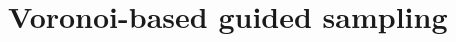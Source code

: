 \documentclass{llncs}
\def\qstart{q_{start}}
\def\qinit{\qstart}
\def\T{\mathcal{T}}
\def\CF{\mathcal{C}_{free}}
\def\probe{r_{\mathrm{probe}}}
\def\gprobe{r_{\mathrm{out}}}
\def\Sgprobe{S_{\mathrm{out}}}
\def\SB{\mathbf{S}_{blocking}}
\def\SS{\mathbf{S}}
\begin{document}

%
%


\section{Voronoi-based guided sampling}
\label{sec::vbg}
\end{document}

